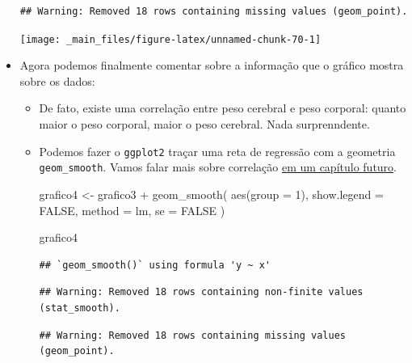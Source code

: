 \documentclass[
  11pt]{report}
\newenvironment{Shaded}{\begin{snugshade}}{\end{snugshade}}
\newcommand{\AttributeTok}[1]{\textcolor[rgb]{0.77,0.63,0.00}{#1}}
\newcommand{\ConstantTok}[1]{\textcolor[rgb]{0.00,0.00,0.00}{#1}}
\newcommand{\DecValTok}[1]{\textcolor[rgb]{0.00,0.00,0.81}{#1}}
\newcommand{\FunctionTok}[1]{\textcolor[rgb]{0.00,0.00,0.00}{#1}}
\newcommand{\NormalTok}[1]{#1}
\newcommand{\OtherTok}[1]{\textcolor[rgb]{0.56,0.35,0.01}{#1}}
\newcommand{\SpecialCharTok}[1]{\textcolor[rgb]{0.00,0.00,0.00}{#1}}
\newcommand{\StringTok}[1]{\textcolor[rgb]{0.31,0.60,0.02}{#1}}
\renewenvironment{Shaded}{
    \begin{mdframed}[%
      roundcorner=2pt,%
      innerleftmargin=5pt,%
      innerrightmargin=5pt,%
      topline=true,%
      leftline=true,%
      rightline=true,%
      bottomline=true,%
      linewidth=0.5pt,%
      linecolor=black!20,%
      backgroundcolor=black!2,%
      skipabove=2ex,%
      skipbelow=2.5ex%
    ]%
  }
  {
    \end{mdframed}
  }
\begin{document}
\begin{itemize}
\begin{verbatim}
## Warning: Removed 18 rows containing missing values (geom_point).
\end{verbatim}

  \begin{center}\texttt{[image: \_main\_files/figure-latex/unnamed-chunk-70-1]} \end{center}
\item
  Agora podemos finalmente comentar sobre a informação que o gráfico mostra sobre os dados:

  \begin{itemize}
  \item
    De fato, existe uma correlação entre peso cerebral e peso corporal: quanto maior o peso corporal, maior o peso cerebral. Nada surprenndente.
  \item
    \protect\hypertarget{grafico4}{}{} Podemos fazer o \texttt{ggplot2} traçar uma reta de regressão com a geometria \texttt{geom\_smooth}. Vamos falar mais sobre correlação \protect\hyperlink{correlacao}{em um capítulo futuro}.

\begin{Shaded}
\begin{Highlighting}[]
\NormalTok{grafico4 }\OtherTok{\textless{}{-}}\NormalTok{ grafico3 }\SpecialCharTok{+}
  \FunctionTok{geom\_smooth}\NormalTok{(}
    \FunctionTok{aes}\NormalTok{(}\AttributeTok{group =} \DecValTok{1}\NormalTok{), }
    \AttributeTok{show.legend =} \ConstantTok{FALSE}\NormalTok{,}
    \AttributeTok{method =} \StringTok{\textquotesingle{}lm\textquotesingle{}}\NormalTok{, }
    \AttributeTok{se =} \ConstantTok{FALSE}
\NormalTok{  )}

\NormalTok{grafico4}
\end{Highlighting}
\end{Shaded}

\begin{verbatim}
## `geom_smooth()` using formula 'y ~ x'
\end{verbatim}

\begin{verbatim}
## Warning: Removed 18 rows containing non-finite values (stat_smooth).
\end{verbatim}

\begin{verbatim}
## Warning: Removed 18 rows containing missing values (geom_point).
\end{verbatim}


\end{itemize}
\end{itemize}
\end{document}
